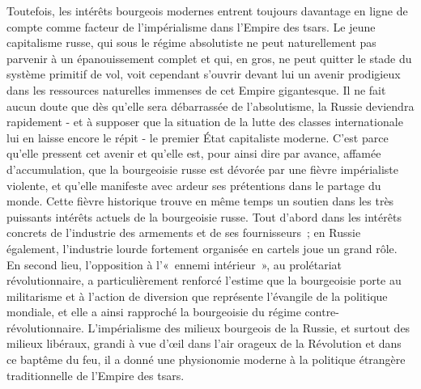 \documentclass[french,twoside]{book} %
\begin{document}
Toutefois, les intérêts bourgeois modernes entrent toujours davantage en ligne de compte comme facteur de l’impérialisme dans l’Empire des tsars. Le jeune capitalisme russe, qui sous le régime absolutiste ne peut naturellement pas parvenir à un épanouissement complet et qui, en gros, ne peut quitter le stade du système primitif de vol, voit cependant s’ouvrir devant lui un avenir prodigieux dans les ressources naturelles immenses de cet Empire gigantesque. Il ne fait aucun doute que dès qu’elle sera débarrassée de l’absolutisme, la Russie deviendra rapidement - et à supposer que la situation de la lutte des classes internationale lui en laisse encore le répit - le premier État capitaliste moderne. C'est parce qu’elle pressent cet avenir et qu’elle est, pour ainsi dire par avance, affamée d’accumulation, que la bourgeoisie russe est dévorée par une fièvre impérialiste violente, et qu’elle manifeste avec ardeur ses prétentions dans le partage du monde. Cette fièvre historique trouve en même temps un soutien dans les très puissants intérêts actuels de la bourgeoisie russe. Tout d’abord dans les intérêts concrets de l’industrie des armements et de ses fournisseurs ; en Russie également, l’industrie lourde fortement organisée en cartels joue un grand rôle. En second lieu, l’opposition à l’« ennemi intérieur », au prolétariat révolutionnaire, a particulièrement renforcé l’estime que la bourgeoisie porte au militarisme et à l’action de diversion que représente l’évangile de la politique mondiale, et elle a ainsi rapproché la bourgeoisie du régime contre-révolutionnaire. L'impérialisme des milieux bourgeois de la Russie, et surtout des milieux libéraux, grandi à vue d’œil dans l’air orageux de la Révolution et dans ce baptême du feu, il a donné une physionomie moderne à la politique étrangère traditionnelle de l’Empire des tsars.\par
\end{document}
